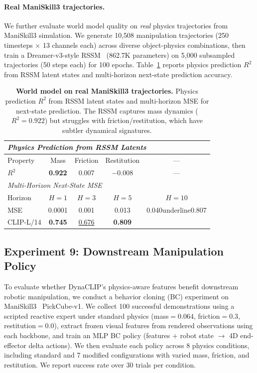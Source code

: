 \documentclass{article}
\newcommand{\methodname}{DynaCLIP}
\begin{document}
\paragraph{Real ManiSkill3 trajectories.}
We further evaluate world model quality on \emph{real} physics trajectories from ManiSkill3 simulation. We generate 10{,}508 manipulation trajectories (250 timesteps $\times$ 13 channels each) across diverse object-physics combinations, then train a Dreamer-v3-style RSSM~\cite{gafner2023dreamerv3} (862.7K parameters) on 5{,}000 subsampled trajectories (50 steps each) for 100 epochs. Table~\ref{tab:worldmodel_real} reports physics prediction $R^2$ from RSSM latent states and multi-horizon next-state prediction accuracy.

\begin{table}[h]
\centering
\caption{\textbf{World model on real ManiSkill3 trajectories.} Physics prediction $R^2$ from RSSM latent states and multi-horizon MSE for next-state prediction. The RSSM captures mass dynamics ($R^2{=}0.922$) but struggles with friction/restitution, which have subtler dynamical signatures.}
\label{tab:worldmodel_real}
\small
\begin{tabular}{lcccc}
\toprule
\multicolumn{5}{l}{\emph{Physics Prediction from RSSM Latents}} \\
\midrule
Property & Mass & Friction & Restitution & --- \\
$R^2$ & \textbf{0.922} & 0.007 & $-$0.008 & --- \\
\midrule
\multicolumn{5}{l}{\emph{Multi-Horizon Next-State MSE}} \\
\midrule
Horizon & $H{=}1$ & $H{=}3$ & $H{=}5$ & $H{=}10$ \\
MSE & 0.0001 & 0.001 & 0.013 & 0.040underline{0.807} \\
CLIP-L/14 & \textbf{0.745} & \underline{0.676} & \textbf{0.809} \\
\bottomrule
\end{tabular}
\end{table}


\subsection{Experiment 9: Downstream Manipulation Policy}
\label{sec:downstream_policy}

To evaluate whether \methodname{}'s physics-aware features benefit downstream robotic manipulation, we conduct a behavior cloning (BC) experiment on ManiSkill3~\cite{hu2023maniskill3} PickCube-v1. We collect 100 successful demonstrations using a scripted reactive expert under standard physics (mass${=}0.064$, friction${=}0.3$, restitution${=}0.0$), extract frozen visual features from rendered observations using each backbone, and train an MLP BC policy (features $+$ robot state $\to$ 4D end-effector delta actions). We then evaluate each policy across 8 physics conditions, including standard and 7 modified configurations with varied mass, friction, and restitution. We report success rate over 30 trials per condition.
\end{document}
